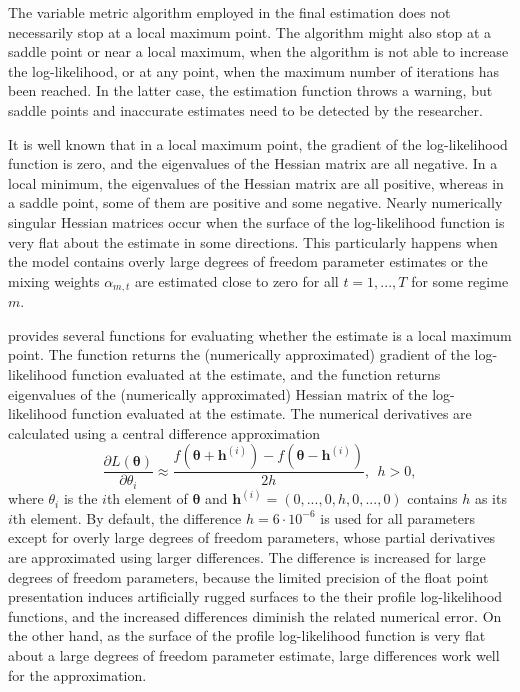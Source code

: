 \documentclass[nojss]{jss} %
\begin{document}
The variable metric algorithm employed in the final estimation does not necessarily stop at a local maximum point. The algorithm might also stop at a saddle point or near a local maximum, when the algorithm is not able to increase the log-likelihood, or at any point, when the maximum number of iterations has been reached. In the latter case, the estimation function throws a warning, but saddle points and inaccurate estimates need to be detected by the researcher.

It is well known that in a local maximum point, the gradient of the log-likelihood function is zero, and the eigenvalues of the Hessian matrix are all negative. In a local minimum, the eigenvalues of the Hessian matrix are all positive, whereas in a saddle point, some of them are positive and some negative. Nearly numerically singular Hessian matrices occur when the surface of the log-likelihood function is very flat about the estimate in some directions. This particularly happens when the model contains overly large degrees of freedom parameter estimates or the mixing weights $\alpha_{m,t}$ are estimated close to zero for all $t=1,...,T$ for some regime $m$.

 provides several functions for evaluating whether the estimate is a local maximum point. The function  returns the (numerically approximated) gradient of the log-likelihood function evaluated at the estimate, and the function  returns eigenvalues of the (numerically approximated) Hessian matrix of the log-likelihood function evaluated at the estimate. The numerical derivatives are calculated using a central difference approximation
\begin{equation}
\frac{\partial L(\boldsymbol{\theta})}{\partial \theta_i} \approx \frac{f(\boldsymbol{\theta} + \boldsymbol{h}^{(i)}) - f(\boldsymbol{\theta} - \boldsymbol{h}^{(i)})}{2h}, \ \ h>0,
\end{equation}
where $\theta_i$ is the $i$th element of $\boldsymbol{\theta}$ and $\boldsymbol{h}^{(i)}=(0,...,0,h,0,...,0)$
contains $h$ as its $i$th element. By default, the difference $h=6\cdot 10^{-6}$ is used for all parameters except for overly large degrees of freedom parameters, whose partial derivatives are approximated using larger differences. The difference is increased for large degrees of freedom parameters, because the limited precision of the float point presentation induces artificially rugged surfaces to the their profile log-likelihood functions, and the increased differences diminish the related numerical error. On the other hand, as the surface of the profile log-likelihood function is very flat about a large degrees of freedom parameter estimate, large differences work well for the approximation.
\end{document}
